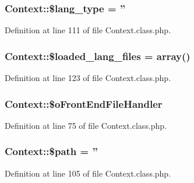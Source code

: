 \hypertarget{classContext_a170ac1b95c16b53af329395df9376e9f}{
\subsubsection[{\$lang\+\_\+type}]{\setlength{\rightskip}{0pt plus 5cm}Context\+::\$lang\+\_\+type = ''}}\label{classContext_a170ac1b95c16b53af329395df9376e9f}


Definition at line 111 of file Context.\+class.\+php.

\hypertarget{classContext_a0a199fec60b92b21746f1b6e93df01dc}{
\subsubsection[{\$loaded\+\_\+lang\+\_\+files}]{\setlength{\rightskip}{0pt plus 5cm}Context\+::\$loaded\+\_\+lang\+\_\+files = array()}}\label{classContext_a0a199fec60b92b21746f1b6e93df01dc}


Definition at line 123 of file Context.\+class.\+php.

\hypertarget{classContext_a55e855769152e53af5e2ecb9b889c7f6}{
\subsubsection[{\$o\+Front\+End\+File\+Handler}]{\setlength{\rightskip}{0pt plus 5cm}Context\+::\$o\+Front\+End\+File\+Handler}}\label{classContext_a55e855769152e53af5e2ecb9b889c7f6}


Definition at line 75 of file Context.\+class.\+php.

\hypertarget{classContext_a0752e74e1ec01a4fd63c044a1d3bd28b}{
\subsubsection[{\$path}]{\setlength{\rightskip}{0pt plus 5cm}Context\+::\$path = ''}}\label{classContext_a0752e74e1ec01a4fd63c044a1d3bd28b}


Definition at line 105 of file Context.\+class.\+php.

